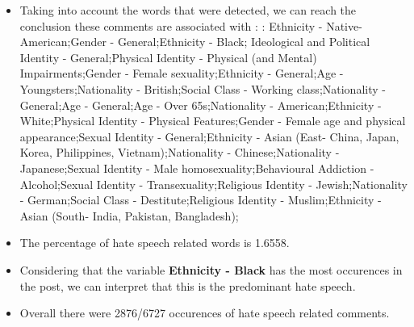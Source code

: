 \documentclass[11pt]{article}
\begin{document}
\begin{itemize}\item Taking into account the words that were detected, we can reach the conclusion these comments are associated with : : Ethnicity - Native-American;Gender - General;Ethnicity - Black; Ideological and Political Identity - General;Physical Identity - Physical (and Mental) Impairments;Gender - Female sexuality;Ethnicity - General;Age - Youngsters;Nationality - British;Social Class - Working class;Nationality - General;Age - General;Age - Over 65s;Nationality - American;Ethnicity - White;Physical Identity - Physical Features;Gender - Female age and physical appearance;Sexual Identity - General;Ethnicity - Asian (East- China, Japan, Korea, Philippines, Vietnam);Nationality - Chinese;Nationality - Japanese;Sexual Identity - Male homosexuality;Behavioural Addiction - Alcohol;Sexual Identity - Transexuality;Religious Identity - Jewish;Nationality - German;Social Class - Destitute;Religious Identity - Muslim;Ethnicity - Asian (South- India, Pakistan, Bangladesh);%

\item The percentage of hate speech related words is 1.6558.

\item Considering that the variable \textbf{Ethnicity - Black} has the most occurences in the post, we can interpret that this is the predominant hate speech.

\item Overall there were 2876/6727 occurences of hate speech related comments.\end{itemize}
\end{document}
